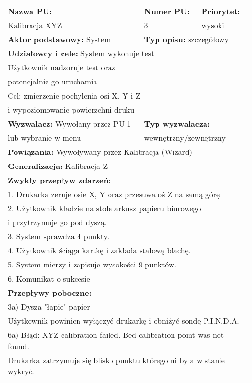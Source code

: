 \documentclass{article}
\begin{document}
\begin{enumerate}[label=\arabic*.]
\newpage
\begin{tabular}{|p{5cm}|p{3cm}|p{3cm}|p{3cm}|p{}|p{3cm}|}
\hline
\multicolumn{4}{|l|}{\textbf{Nazwa PU:}} & \multicolumn{1}{l|}{\textbf{Numer PU:}} & \multicolumn{1}{|l|}{\textbf{Priorytet:} } \\ 
\multicolumn{4}{|l|}{Kalibracja XYZ} & \multicolumn{1}{l|}{3} & \multicolumn{1}{|l|}{wysoki}\\ \hline
\multicolumn{3}{|l|}{\textbf{Aktor podstawowy:} System} & \multicolumn{3}{l|}{\textbf{Typ opisu:} szczegółowy} \\ \hline
\multicolumn{6}{|l|}{\textbf{Udziałowcy i cele:} System wykonuje test} \\ 
\multicolumn{6}{|l|}{Użytkownik nadzoruje test oraz} \\
\multicolumn{6}{|l|}{potencjalnie go uruchamia} \\
\multicolumn{6}{|l|}{Cel: zmierzenie pochylenia osi X, Y i Z} \\ 
\multicolumn{6}{|l|}{i wypoziomowanie powierzchni druku} \\ \hline
\multicolumn{3}{|l|}{\textbf{Wyzwalacz:} Wywołany przez PU 1} & \multicolumn{3}{l|}{\textbf{Typ wyzwalacza:}} \\ 
\multicolumn{3}{|l|}{lub wybranie w menu} & \multicolumn{3}{l|}{wewnętrzny/zewnętrzny} \\ \hline
\multicolumn{6}{|l|}{\textbf{Powiązania:} Wywoływany przez Kalibracja (Wizard)} \\
\multicolumn{6}{|l|}{\textbf{Generalizacja:} Kalibracja Z} \\
\hline
\multicolumn{6}{|l|}{\textbf{Zwykły przepływ zdarzeń:}} \\
\multicolumn{6}{|l|}{1. Drukarka zeruje osie X, Y oraz przesuwa oś Z na samą górę} \\
\multicolumn{6}{|l|}{2. Użytkownik kładzie na stole arkusz papieru biurowego} \\
\multicolumn{6}{|l|}{i przytrzymuje go pod dyszą.} \\
\multicolumn{6}{|l|}{3. System sprawdza 4 punkty.} \\
\multicolumn{6}{|l|}{4. Użytkownik ściąga kartkę i zakłada stalową blachę.} \\
\multicolumn{6}{|l|}{5. System mierzy i zapisuje wysokości 9 punktów.} \\
\multicolumn{6}{|l|}{6. Komunikat o sukcesie} \\
\hline
\multicolumn{6}{|l|}{\textbf{Przepływy poboczne:}} \\
\multicolumn{6}{|l|}{3a) Dysza "łapie" papier} \\
\multicolumn{6}{|l|}{Użytkownik powinien wyłączyć drukarkę i obniżyć sondę P.I.N.D.A.} \\ 
\multicolumn{6}{|l|}{6a) Błąd: XYZ calibration failed. Bed calibration point was not found.} \\
\multicolumn{6}{|l|}{Drukarka zatrzymuje się blisko punktu którego ni była w stanie wykryć.} \\
\hline
\end{tabular}


\end{enumerate}
\end{document}
